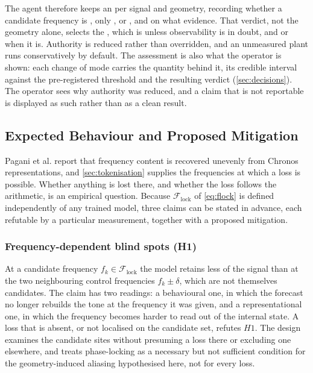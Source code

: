 The agent therefore keeps an  per signal and geometry, recording whether a candidate frequency is , only , or , and on what evidence. That verdict, not the geometry alone, selects the , which is  unless observability is in doubt, and  or  when it is. Authority is reduced rather than overridden, and an unmeasured plant runs conservatively by default. The assessment is also what the operator is shown: each change of mode carries the quantity behind it, its credible interval against the pre-registered threshold and the resulting verdict (\autoref{sec:decisions}). The operator sees why authority was reduced, and a claim that is not reportable is displayed as such rather than as a clean result.
\endgroup

\subsection{Expected Behaviour and Proposed Mitigation}\label{sec:hypotheses}
Pagani et al.\autocite{paganiPreliminaryInsightsChronos2026} report that frequency content is recovered unevenly from Chronos representations, and \autoref{sec:tokenisation} supplies the frequencies at which a loss is possible. Whether anything is lost there, and whether the loss follows the arithmetic, is an empirical question. Because $\mathcal{F}_{\mathrm{lock}}$ of \autoref{eq:flock} is defined independently of any trained model, three claims can be stated in advance, each refutable by a particular measurement, together with a proposed mitigation.

\subsubsection*{Frequency-dependent blind spots (H1)}
At a candidate frequency $f_k\in\mathcal F_{\mathrm{lock}}$ the model retains less of the signal than at the two neighbouring control frequencies $f_k\pm\delta$, which are not themselves candidates. The claim has two readings: a behavioural one, in which the forecast no longer rebuilds the tone at the frequency it was given, and a representational one, in which the frequency becomes harder to read out of the internal state. A loss that is absent, or not localised on the candidate set, refutes $H1$. The design examines the candidate sites without presuming a loss there or excluding one elsewhere, and treats phase-locking as a necessary but not sufficient condition for the geometry-induced aliasing hypothesised here, not for every loss.

